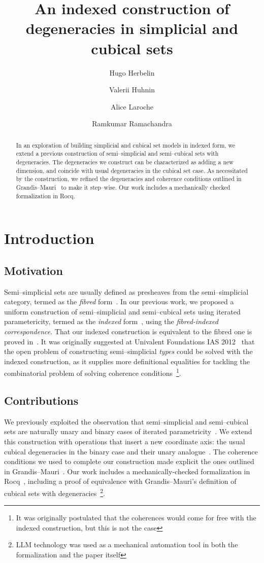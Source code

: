 \documentclass[a4paper,UKenglish,cleveref,autoref]{lipics-v2021}
\title{An indexed construction of degeneracies in simplicial and cubical sets}
\author{Hugo Herbelin}{Université Paris Cité, Inria, CNRS, IRIF, Paris, France}{Hugo.Herbelin@inria.fr}{}{}
\author{Valerii Huhnin}{Université Paris Cité, Paris, France}{valerii.huhnin@etu.u-paris.fr}{}{}
\author{Alice Laroche}{Université Paris Cité, Paris, France}{alice.laroche@etu.u-paris.fr}{}{}
\author{Ramkumar Ramachandra}{Unaffiliated}{r@artagnon.com}{}{}
\newcommand{\linkicon}{\texorpdfstring{\faLink}{🔗}}
\begin{document}
\maketitle

\begin{abstract}
  In an exploration of building simplicial and cubical set models in indexed form, we extend a previous construction of semi--simplicial and semi--cubical sets with degeneracies. The degeneracies we construct can be characterized as adding a new dimension, and coincide with usual degeneracies in the cubical set case. As necessitated by the construction, we refined the degeneracies and coherence conditions outlined in Grandis--Mauri~\cite{grandis03} to make it step--wise. Our work includes a mechanically checked formalization in Rocq.
\end{abstract}

\section{Introduction}
\subsection{Motivation}
Semi--simplicial sets are usually defined as presheaves from the semi--simplicial category, termed as the \emph{fibred} form~\cite{rourkesanderson71}. In our previous work, we proposed a uniform construction of semi--simplicial and semi--cubical sets using iterated parametericity, termed as the \emph{indexed} form~\cite{hr25}, using the \emph{fibred-indexed correspondence}. That our indexed construction is equivalent to the fibred one is proved in~\cite{Laroche26}. It was originally suggested at Univalent Foundations IAS 2012~\cite{UFwiki2012} that the open problem of constructing semi--simplicial \emph{types} could be solved with the indexed construction, as it supplies more definitional equalities for tackling the combinatorial problem of solving coherence conditions~\footnote{It was originally postulated that the coherences would come for free with the indexed construction, but this is not the case}.

\subsection{Contributions}
We previously exploited the observation that semi--simplicial and semi--cubical sets are naturally unary and binary cases of iterated parametricity~\cite{hr25}. We extend this construction with operations that insert a new coordinate axis: the usual cubical degeneracies in the binary case and their unary analogue~\cite{bernardy15,bernardy12}. The coherence conditions we used to complete our construction made explicit the ones outlined in Grandis--Mauri~\cite{grandis03}. Our work includes a mechanically-checked formalization in Rocq~\href{https://github.com/artagnon/bonak}{\linkicon}, including a proof of equivalence with Grandis--Mauri's definition of cubical sets with degeneracies~\footnote{LLM technology was used as a mechanical automation tool in both the formalization and the paper itself}.
\end{document}
